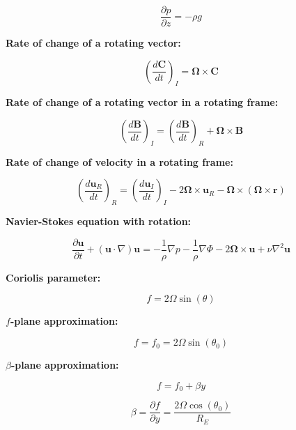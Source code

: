 \documentclass[12pt]{article}
\numberwithin{equation}{section}
\numberwithin{figure}{section}
\numberwithin{table}{section}
\begin{document}
\begin{equation}
  \frac{\partial p}{\partial z} = -\rho g
\end{equation}

\textbf{Rate of change of a rotating vector:}

\begin{equation}
  \left(\frac{d\mathbf{C}}{dt}\right)_I = \mathbf{\Omega} \times \mathbf{C}
\end{equation}

\textbf{Rate of change of a rotating vector in a rotating frame:}

\begin{equation}
  \left(\frac{d\mathbf{B}}{dt}\right)_I = \left(\frac{d\mathbf{B}}{dt}\right)_R + \mathbf{\Omega} \times \mathbf{B}
\end{equation}

\textbf{Rate of change of velocity in a rotating frame:}

\begin{equation}
  \left( \frac{d \mathbf{u}_R}{dt} \right)_R =
  \left( \frac{d \mathbf{u}_I}{dt} \right)_I -
  2 \mathbf{\Omega} \times \mathbf{u}_R -
  \mathbf{\Omega} \times \left( \mathbf{\Omega} \times \mathbf{r} \right)
\end{equation}

\textbf{Navier-Stokes equation with rotation:}

\begin{equation}
  \frac{\partial \mathbf{u}}{\partial t} +
  \left( \mathbf{u} \cdot \nabla \right) \mathbf{u} =
  - \frac{1}{\rho} \nabla p
  - \frac{1}{\rho} \nabla \Phi
  - 2 \mathbf{\Omega} \times \mathbf{u}
  + \nu \nabla^2 \mathbf{u}
\end{equation}

\textbf{Coriolis parameter:}

\begin{equation}
  f = 2 \Omega \sin(\theta)
\end{equation}

\textbf{$f$-plane approximation:}

\begin{equation}
  f = f_0 = 2 \Omega \sin(\theta_0)
\end{equation}

\textbf{$\beta$-plane approximation:}

\begin{equation}
  f = f_0 + \beta y
\end{equation}

\begin{equation}
  \beta = \frac{\partial f}{\partial y} = \frac{2\Omega\cos(\theta_0)}{R_E}
\end{equation}
\end{document}
